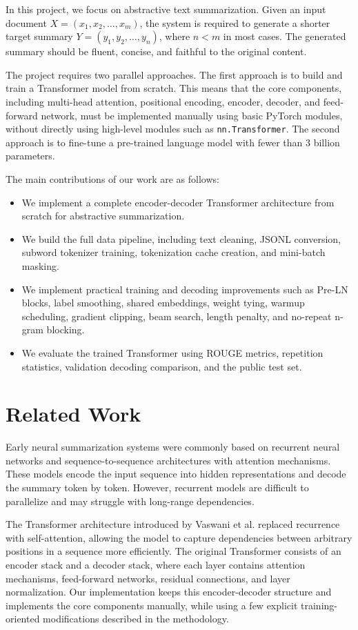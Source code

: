 \documentclass[conference]{IEEEtran}
\begin{document}
In this project, we focus on abstractive text summarization. Given an input document $X = (x_1, x_2, \ldots, x_m)$, the system is required to generate a shorter target summary $Y = (y_1, y_2, \ldots, y_n)$, where $n < m$ in most cases. The generated summary should be fluent, concise, and faithful to the original content.

The project requires two parallel approaches. The first approach is to build and train a Transformer model from scratch. This means that the core components, including multi-head attention, positional encoding, encoder, decoder, and feed-forward network, must be implemented manually using basic PyTorch modules, without directly using high-level modules such as \texttt{nn.Transformer}. The second approach is to fine-tune a pre-trained language model with fewer than 3 billion parameters.

The main contributions of our work are as follows:
\begin{itemize}
    \item We implement a complete encoder-decoder Transformer architecture from scratch for abstractive summarization.
    \item We build the full data pipeline, including text cleaning, JSONL conversion, subword tokenizer training, tokenization cache creation, and mini-batch masking.
    \item We implement practical training and decoding improvements such as Pre-LN blocks, label smoothing, shared embeddings, weight tying, warmup scheduling, gradient clipping, beam search, length penalty, and no-repeat n-gram blocking.
    \item We evaluate the trained Transformer using ROUGE metrics, repetition statistics, validation decoding comparison, and the public test set.
\end{itemize}

\section{Related Work}
Early neural summarization systems were commonly based on recurrent neural networks and sequence-to-sequence architectures with attention mechanisms. These models encode the input sequence into hidden representations and decode the summary token by token. However, recurrent models are difficult to parallelize and may struggle with long-range dependencies.

The Transformer architecture introduced by Vaswani et al. replaced recurrence with self-attention, allowing the model to capture dependencies between arbitrary positions in a sequence more efficiently. The original Transformer consists of an encoder stack and a decoder stack, where each layer contains attention mechanisms, feed-forward networks, residual connections, and layer normalization. Our implementation keeps this encoder-decoder structure and implements the core components manually, while using a few explicit training-oriented modifications described in the methodology.
\end{document}

